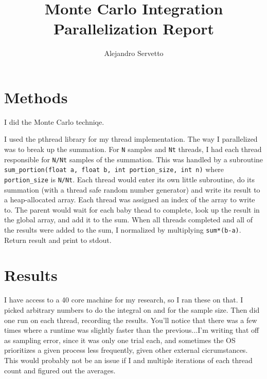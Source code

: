 \documentclass{article}
\title{Monte Carlo Integration Parallelization Report}
\author{Alejandro Servetto}
\begin{document}
\maketitle
\section{Methods}
I did the Monte Carlo techniqe.

I used the pthread library for my thread implementation. The way I parallelized
was to break up the summation. For \texttt{N} samples and \texttt{Nt} threads, I had each 
thread responsible for \texttt{N/Nt} samples of the summation. This was handled by a
subroutine \texttt{sum\_portion(float a, float b, int portion\_size, int n)}
where \texttt{portion\_size} is \texttt{N/Nt}. Each thread would enter its own little
subroutine, do its summation (with a thread safe random number generator) and write
its result to a heap-allocated array. Each thread was assigned an index of the array
to write to. The parent would wait for each baby thead to complete, look up the result
in the global array, and add it to the sum. When all threads completed and all of the
results were added to the sum, I normalized by multiplying \texttt{sum*(b-a)}.
Return result and print to stdout.

\section{Results}

I have access to a 40 core machine for my research, so I ran these on that. I picked arbitrary numbers
to do the integral on and for the sample size. Then did one run on each thread, recording the results.
You'll notice that there was a few times where a runtime was slightly faster than the previous...I'm
writing that off as sampling error, since it was only one trial each, and sometimes the OS prioritizes
a given process less frequently, given other external cicrumstances. This would probably
not be an issue if I and multiple iterations of each thread count and figured out the averages.
\end{document}
